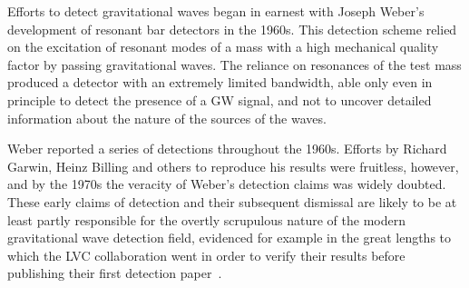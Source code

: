
Efforts to detect gravitational waves began in earnest with Joseph Weber's development of resonant bar detectors 
in the 1960s. This detection scheme relied on the excitation of resonant modes of a mass with a high mechanical 
quality factor by passing gravitational waves. The reliance on resonances of the test mass produced a detector 
with an extremely limited bandwidth, able only even in principle to detect the presence of a GW signal, and not 
to uncover detailed information about the nature of the sources of the waves. 

Weber reported a series of detections throughout the 1960s. Efforts by Richard Garwin, Heinz Billing and others 
to reproduce his results were fruitless, however, and by the 1970s the veracity of Weber's detection claims was widely doubted. 
These early claims of detection and their subsequent dismissal are likely to be at least partly responsible for the 
overtly scrupulous nature of the modern gravitational wave detection field, evidenced for example in the great lengths to which 
the LVC collaboration went in order to verify their results before publishing their first detection paper~\cite{GW150914}.

